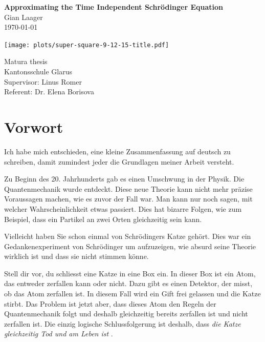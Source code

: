 \documentclass[11pt,DIV=10,final]{scrreprt} %
\begin{document}
\begin{titlepage}
\mbox{}\vspace{0.1\textheight}
\begin{center}
\textbf{\Huge Approximating the Time Independent Schrödinger Equation}\\[3ex]
Gian Laager\\
\today
\vspace{0.05\textheight}
\begin{center}
	\texttt{[image: plots/super-square-9-12-15-title.pdf]}
\end{center}
\vspace{0.05\textheight}
Matura thesis\\
Kantonsschule Glarus\\[3ex]
Supervisor: Linus Romer\\
Referent: Dr. Elena Borisova
\end{center}
\end{titlepage}


\tableofcontents

\pagebreak[4]

\chapter*{Vorwort}
Ich habe mich entschieden, eine kleine Zusammenfassung auf deutsch zu schreiben, damit zumindest jeder die Grundlagen meiner Arbeit versteht.

Zu Beginn des 20. Jahrhunderts gab es einen Umschwung in der Physik. Die Quantenmechanik wurde entdeckt. Diese neue Theorie kann nicht mehr präzise Voraussagen machen, wie es zuvor der Fall war.
Man kann nur noch sagen, mit welcher Wahrscheinlichkeit etwas passiert. Dies hat bizarre Folgen, wie zum Beispiel, dass ein Partikel an zwei Orten gleichzeitig sein kann.

Vielleicht haben Sie schon einmal von Schrödingers Katze gehört. Dies war ein Gedankenexperiment von Schrödinger um aufzuzeigen, wie absurd seine Theorie wirklich ist und dass sie nicht stimmen könne.

Stell dir vor, du schliesst eine Katze in eine Box ein. In dieser Box ist ein Atom, das entweder zerfallen kann oder nicht. Dazu gibt es einen Detektor, der misst, ob das Atom zerfallen ist. In diesem Fall
wird ein Gift frei gelassen und die Katze stirbt.
Das Problem ist jetzt aber, dass dieses Atom den Regeln der Quantenmechanik folgt und deshalb gleichzeitig bereits zerfallen ist und nicht zerfallen ist. Die einzig logische Schlussfolgerung ist deshalb,
dass \emph{die Katze gleichzeitig Tod und am Leben ist} \citep{schrodinger1935gegenwartige}.
\end{document}
